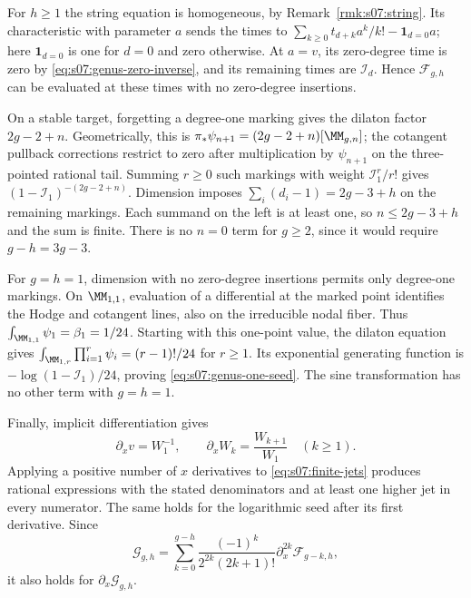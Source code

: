 \begin{prf}
For $h\geq1$ the string equation is homogeneous, by
Remark~\ref{rmk:s07:string}. Its characteristic with parameter $a$
sends the times to
$\sum_{k\geq0}t_{d+k}a^k/k!-\mathbf1_{d=0}a$; here
$\mathbf1_{d=0}$ is one for $d=0$ and zero otherwise.
At $a=v$, its zero-degree time is zero by
\eqref{eq:s07:genus-zero-inverse}, and its remaining times are
$\mathcal I_d$. Hence $\mathcal F_{g,h}$ can be evaluated at these
times with no zero-degree insertions.

On a stable target, forgetting a degree-one marking gives the dilaton
factor $2g-2+n$. Geometrically, this is
$\pi_*\psi_{n+1}=(2g-2+n)[\MM_{g,n}]$; the cotangent pullback
corrections restrict to zero after multiplication by $\psi_{n+1}$
on the three-pointed rational tail. Summing $r\geq0$ such markings
with weight $\mathcal I_1^r/r!$ gives
$(1-\mathcal I_1)^{-(2g-2+n)}$. Dimension imposes
$\sum_i(d_i-1)=2g-3+h$ on the remaining markings. Each summand on
the left is at least one, so $n\leq2g-3+h$ and the sum is finite.
There is no $n=0$ term for $g\geq2$, since it would require
$g-h=3g-3$.

For $g=h=1$, dimension with no zero-degree insertions permits only
degree-one markings. On $\MM_{1,1}$, evaluation of a differential at
the marked point identifies the Hodge and cotangent lines, also on
the irreducible nodal fiber. Thus
$\int_{\MM_{1,1}}\psi_1=\beta_1=1/24$.
Starting with this one-point value, the dilaton equation gives
$\int_{\MM_{1,r}}\prod_{i=1}^r\psi_i=(r-1)!/24$ for $r\geq1$.
Its exponential generating function is
$-\log(1-\mathcal I_1)/24$, proving
\eqref{eq:s07:genus-one-seed}. The sine transformation has no
other term with $g=h=1$.

Finally, implicit differentiation gives
\begin{equation}\label{eq:s07:jet-x}
 \partial_xv=W_1^{-1},\qquad
 \partial_xW_k=\frac{W_{k+1}}{W_1}\quad(k\geq1).
\end{equation}
Applying a positive number of $x$ derivatives to
\eqref{eq:s07:finite-jets} produces rational expressions with the
stated denominators and at least one higher jet in every numerator.
The same holds for the logarithmic seed after its first derivative.
Since
\[
 \mathcal G_{g,h}
 =\sum_{k=0}^{g-h}\frac{(-1)^k}{2^{2k}(2k+1)!}
                           \partial_x^{2k}\mathcal F_{g-k,h},
\]
it also holds for $\partial_x\mathcal G_{g,h}$.
\end{prf}

